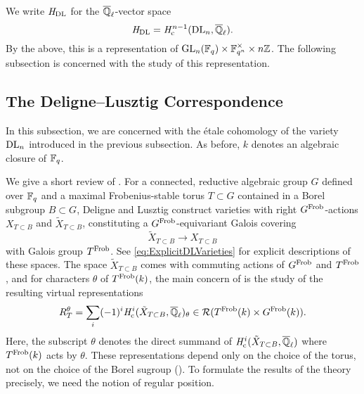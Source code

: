 \documentclass[../main.tex]{subfiles}
\begin{document}
We write $\mathit H_{\mathrm{DL}}$ for the $\overline {\mathbb{Q}}_\ell$-vector space
\begin{equation*}
  \mathit H_{\mathrm{DL}} = \mathit H_{\mathrm{c}}^{n-1}(\mathrm{DL}_n, \overline {\mathbb{Q}}_\ell).
\end{equation*}
By the above, this is a representation of $\operatorname{GL}_n(\mathbb{F}_q) \times \mathbb{F}_{q^n}^\times
\times n\mathbb{Z}$. The following subsection is concerned with the study of this
representation.


\subsection{The Deligne--Lusztig Correspondence} %
\label{sub:The Deligne--Lusztig Correspondence for the Explicit Example}

In this subsection, we are concerned with the \'etale cohomology of the variety
$\mathrm{DL}_n$ introduced in the previous subsection. As before, $k$ denotes an algebraic
closure of $\mathbb{F}_q$.

We give a short review of \cite{delignelusztig1976}.
For a connected, reductive algebraic group $G$ defined over $\mathbb{F}_q$ and a maximal
Frobenius-stable torus $T \subset G$ contained in a Borel subgroup $B
\subset G$, Deligne and Lusztig construct varieties with right $G^{\mathrm{Frob}}$-actions
$X_{T\subset B}$ and $\tilde X_{T \subset B}$, constituting a $G^{\mathrm{Frob}}$-equivariant
Galois covering
\begin{equation*}
  \tilde X_{T \subset B} \to X_{T \subset B}
\end{equation*}
with Galois group $T^{\mathrm{Frob}}$. See \eqref{eq:ExplicitDLVarieties} for explicit
descriptions of these spaces. The space $\tilde X_{T \subset B}$ comes with
commuting actions of $G^{\mathrm{Frob}}$ and $T^{\mathrm{Frob}}$, and for characters $\theta$ of $T^{\mathrm{Frob}}(k)$,
the main concern of \cite{delignelusztig1976} is the study of the resulting
virtual representations
\begin{equation} \label{eq:DLRepresentation}
  R_{T}^\theta = \sum_{i} (-1)^i \mathit H_{\mathrm{c}}^i(\tilde X_{T \subset B}, \overline
  {\mathbb{Q}}_\ell)_\theta \in \mathcal{R}(T^{\mathrm{Frob}}(k) \times G^{\mathrm{Frob}}(k)).
\end{equation}
Here, the subscript $\theta$ denotes the direct summand of $\mathit H_{\mathrm{c}}^i(\tilde X_{T
\subset B}, \overline {\mathbb{Q}}_\ell)$ where $T^{\mathrm{Frob}}(k)$ acts by $\theta$.
These representations depend only on the choice of the torus, not on the
choice of the Borel sugroup
(\cite[Corollary 4.3]{delignelusztig1976}). To formulate the results of the theory
precisely, we need the notion of regular position.
\end{document}
